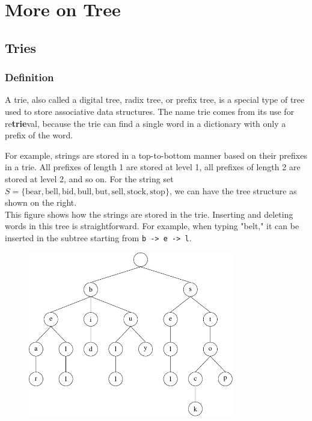 \chapter{More on Tree}

\section{Tries}
\subsection{Definition}
A trie, also called a digital tree, radix tree, or prefix tree, is a special type of tree used to store associative data structures. The name trie comes from its use for re\textbf{trie}val, because the trie can find a single word in a dictionary with only a prefix of the word. 

\begin{minipage}{0.5\textwidth}
For example, strings are stored in a top-to-bottom manner based on their prefixes in a trie. All prefixes of length 1 are stored at level 1, all prefixes of length 2 are stored at level 2, and so on. For the string set \( S = \{ \text{bear}, \text{bell}, \text{bid}, \text{bull}, \text{but}, \text{sell}, \text{stock}, \text{stop} \} \), we can have the tree structure as shown on the right. \\[3pt]
This figure shows how the strings are stored in the trie. Inserting and deleting words in this tree is straightforward. For example, when typing "belt," it can be inserted in the subtree starting from \verb|b -> e -> l|.
\end{minipage}
\begin{minipage}{0.5\textwidth}
\begin{figure}[H]
  \centering
  \includegraphics[width=0.8\textwidth]{Figure/Tries.pdf}  
\end{figure}
\end{minipage}

